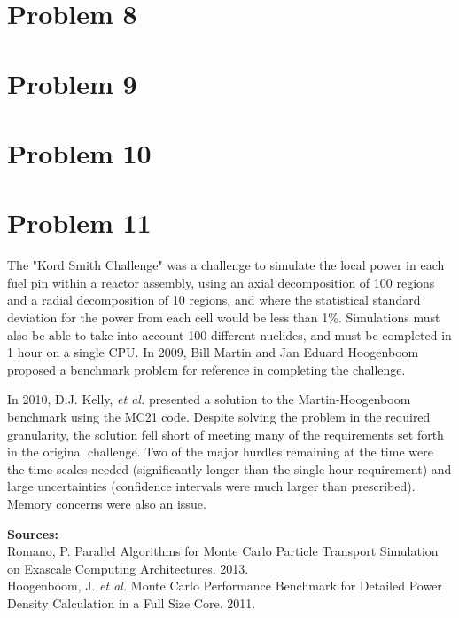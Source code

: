 \documentclass{article}
\begin{document}

\section*{Problem 8}





\section*{Problem 9}





\section*{Problem 10}





\section*{Problem 11}

The "Kord Smith Challenge" was a challenge to simulate the local power in each fuel pin within a reactor assembly, using an axial decomposition of 100 regions and a radial decomposition of 10 regions, and where the statistical standard deviation for the power from each cell would be less than 1\%. Simulations must also be able to take into account 100 different nuclides, and must be completed in 1 hour on a single CPU. In 2009, Bill Martin and Jan Eduard Hoogenboom proposed a benchmark problem for reference in completing the challenge. 

In 2010, D.J. Kelly, \textit{et al.} presented a solution to the Martin-Hoogenboom benchmark using the MC21 code. Despite solving the problem in the required granularity, the solution fell short of meeting many of the requirements set forth in the original challenge. Two of the major hurdles remaining at the time were the time scales needed (significantly longer than the single hour requirement) and large uncertainties (confidence intervals were much larger than prescribed). Memory concerns were also an issue.

\textbf{Sources:}\\
Romano, P. Parallel Algorithms for Monte Carlo Particle Transport Simulation on
Exascale Computing Architectures. 2013. \\
Hoogenboom, J. \textit{et al.} Monte Carlo Performance Benchmark for Detailed Power Density Calculation in a Full Size Core. 2011. \\



\end{document}
